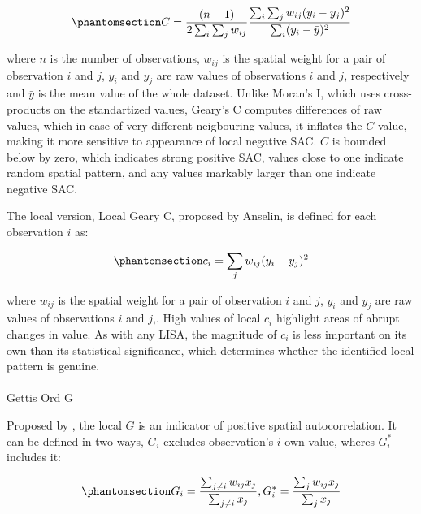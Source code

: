 \documentclass[
  english,
  12pt,
  a4paper,
]{article}
\makeatletter
\let\oldparagraph\paragraph
\renewcommand{\paragraph}{
    \@ifstar
      \xxxParagraphStar
      \xxxParagraphNoStar
  }
\newcommand{\xxxParagraphStar}[1]{\oldparagraph*{#1}\mbox{}}
\newcommand{\xxxParagraphNoStar}[1]{\oldparagraph{#1}\mbox{}}
\makeatother
\begin{document}
\begin{equation}\phantomsection\label{eq-global_c}{
C = \frac{(n - 1)}{2 \sum_i \sum_j w_{ij}} \frac{\sum_i \sum_j w_{ij} (y_i - y_j)^2}{\sum_i (y_i - \bar{y})^2}
}\end{equation}

where \(n\) is the number of observations, \(w_{ij}\) is the spatial
weight for a pair of observation \(i\) and \(j\), \(y_i\) and \(y_j\)
are raw values of observations \(i\) and \(j\), respectively and
\(\bar{y}\) is the mean value of the whole dataset. Unlike Moran's I,
which uses cross-products on the standartized values, Geary's C computes
differences of raw values, which in case of very different neigbouring
values, it inflates the \(C\) value, making it more sensitive to
appearance of local negative SAC. \(C\) is bounded below by zero, which
indicates strong positive SAC, values close to one indicate random
spatial pattern, and any values markably larger than one indicate
negative SAC.

The local version, Local Geary C, proposed by Anselin, is defined for
each observation \(i\) as:

\begin{equation}\phantomsection\label{eq-local_c}{
c_i = \sum_j w_{ij}(y_i - y_j)^2
}\end{equation}

where \(w_{ij}\) is the spatial weight for a pair of observation \(i\)
and \(j\), \(y_i\) and \(y_j\) are raw values of observations \(i\) and
\(j\),. High values of local \(c_i\) highlight areas of abrupt changes
in value. As with any LISA, the magnitude of \(c_i\) is less important
on its own than its statistical significance, which determines whether
the identified local pattern is genuine.

\paragraph{Gettis Ord G}\label{gettis-ord-g}

Proposed by \citet{getis1992}, the local \(G\) is an indicator of
positive spatial autocorrelation. It can be defined in two ways, \(G_i\)
excludes observation's \(i\) own value, wheres \(G_i^*\) includes it:

\begin{equation}\phantomsection\label{eq-local_g}{ G_i = \frac{\sum_{j \neq i} w_{ij} x_j}{\sum_{j \neq i} x_j},G_i^* = \frac{\sum_j w_{ij} x_j}{\sum_j x_j} }\end{equation}
\end{document}
